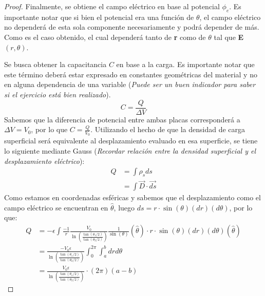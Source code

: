 \begin{proof}
    Finalmente, se obtiene el campo eléctrico en base al potencial $\phi_{e}$. Es importante notar que si bien el potencial era una función de $\theta$, el campo eléctrico no dependerá de esta sola componente necesariamente y podrá depender de más. Como es el caso obtenido, el cual dependerá tanto de \textbf{r} como de \textbf{$\theta$} tal que \textbf{E}$(r,\theta)$.
    \item Se busca obtener la capacitancia $C$ en base a la carga. Es importante notar que este término deberá estar expresado en constantes geométricas del material y no en alguna dependencia de una variable (\textit{Puede ser un buen indicador para saber si el ejercicio está bien realizado}).
    \begin{equation}
        C = \frac{Q}{\Delta V}
    \end{equation}
    Sabemos que la diferencia de potencial entre ambas placas corresponderá a $\Delta V = V_{0}$, por lo que $ C = \frac{Q}{V_{0}}$. Utilizando el hecho de que la densidad de carga superficial será equivalente al desplazamiento evaluado en esa superficie, se tiene lo siguiente mediante Gauss (\textit{Recordar relación entre la densidad superficial y el desplazamiento eléctrico}):
    \begin{equation}
        \begin{aligned}
            Q &= \int \rho_{s}  ds \\
              &= \int \Vec{D} \cdot \Vec{ds}
        \end{aligned}
    \end{equation}
    Como estamos en coordenadas esféricas y sabemos que el desplazamiento como el campo eléctrico se encuentran en $\hat{\theta}$, luego $ds= r\cdot \sin(\theta)(dr) (d\theta)$, por lo que:
    \begin{equation}
        \begin{aligned}
            Q &= -\epsilon \int \frac{-1}{r} \frac{V_{0}}{\ln\left(\frac{\tan(\theta_{1}/2)}{\tan(\theta_{2}/2)}\right)}\frac{1}{\sin(\theta)}(\hat{\theta}) \cdot r\cdot \sin(\theta)(dr) (d\theta)(\hat{\theta}) \\
              &=  \frac{-V_{0}\epsilon}{\ln\left(\frac{\tan(\theta_{1}/2)}{\tan(\theta_{2}/2)}\right)} \int_{0}^{2\pi} \int_{a}^{b} dr d\theta \\
              &=  \frac{V_{0}\epsilon}{\ln\left(\frac{\tan(\theta_{1}/2)}{\tan(\theta_{2}/2)}\right)} \cdot(2\pi)(a-b)
        \end{aligned}
    \end{equation}

\end{proof}
